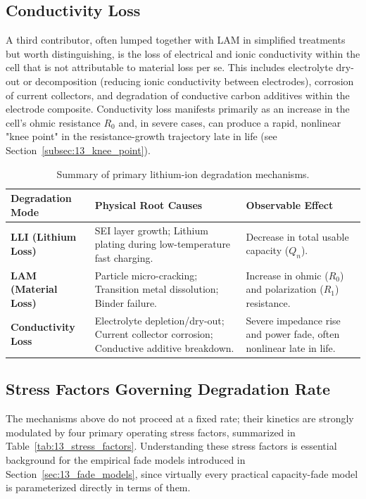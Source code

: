 \subsection{Conductivity Loss}
\label{subsec:13_conductivity}

A third contributor, often lumped together with LAM in simplified treatments but worth distinguishing, is the loss of electrical and ionic conductivity within the cell that is not attributable to material loss per se. This includes electrolyte dry-out or decomposition (reducing ionic conductivity between electrodes), corrosion of current collectors, and degradation of conductive carbon additives within the electrode composite. Conductivity loss manifests primarily as an increase in the cell's ohmic resistance $R_0$ and, in severe cases, can produce a rapid, nonlinear "knee point" in the resistance-growth trajectory late in life (see Section~\ref{subsec:13_knee_point}).

\begin{table}[htbp]
\centering
\caption{Summary of primary lithium-ion degradation mechanisms.}
\label{tab:13_aging_mechanisms}
\renewcommand{\arraystretch}{1.4}
\begin{tabularx}{\textwidth}{@{}l X X@{}}
\toprule
\textbf{Degradation Mode} & \textbf{Physical Root Causes} & \textbf{Observable Effect} \\
\midrule
\textbf{LLI (Lithium Loss)} & SEI layer growth; Lithium plating during low-temperature fast charging. & Decrease in total usable capacity ($Q_n$). \\
\textbf{LAM (Material Loss)} & Particle micro-cracking; Transition metal dissolution; Binder failure. & Increase in ohmic ($R_0$) and polarization ($R_1$) resistance. \\
\textbf{Conductivity Loss} & Electrolyte depletion/dry-out; Current collector corrosion; Conductive additive breakdown. & Severe impedance rise and power fade, often nonlinear late in life. \\
\bottomrule
\end{tabularx}
\end{table}

\subsection{Stress Factors Governing Degradation Rate}
\label{subsec:13_stress_factors}

The mechanisms above do not proceed at a fixed rate; their kinetics are strongly modulated by four primary operating stress factors, summarized in Table~\ref{tab:13_stress_factors}. Understanding these stress factors is essential background for the empirical fade models introduced in Section~\ref{sec:13_fade_models}, since virtually every practical capacity-fade model is parameterized directly in terms of them.

